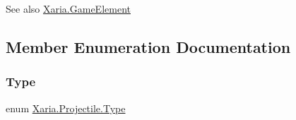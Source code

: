 \begin{DoxySeeAlso}{See also}
\hyperlink{classXaria_1_1GameElement}{Xaria.\+Game\+Element}


\end{DoxySeeAlso}


\subsection{Member Enumeration Documentation}
\mbox{\label{classXaria_1_1Projectile_a2f223d18f3b68ae549d974125826b78d}} 
\subsubsection{\texorpdfstring{Type}{Type}}
{\footnotesize\ttfamily enum \hyperlink{classXaria_1_1Projectile_a2f223d18f3b68ae549d974125826b78d}{Xaria.\+Projectile.\+Type}\hspace{0.3cm}{\ttfamily [strong]}}






